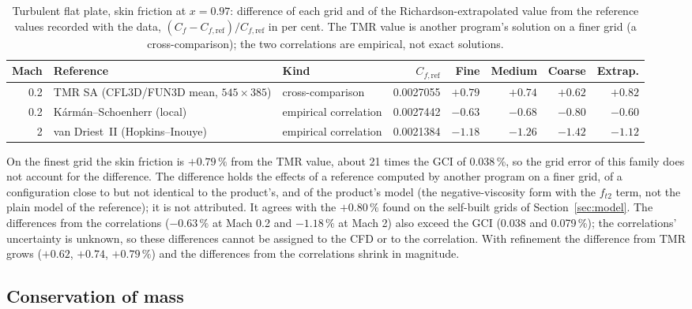 \documentclass[11pt,a4paper]{article}
\begin{document}
\begin{table}[t]
\centering
\caption{Turbulent flat plate, skin friction at $x=0.97$: difference of each grid and of the Richardson-extrapolated value from the reference values recorded with the data,
$(C_f-C_{f,\mathrm{ref}})/C_{f,\mathrm{ref}}$ in per cent. The TMR value is another program's solution on a finer grid (a cross-comparison); the two correlations are empirical, not exact solutions.}
\label{tab:turbref}
\footnotesize
\setlength{\tabcolsep}{4pt}
\begin{tabular}{@{}rp{3.5cm}p{3.1cm}rrrrr@{}}
\toprule
Mach & Reference & Kind & $C_{f,\mathrm{ref}}$ & Fine & Medium & Coarse & Extrap. \\
\midrule
0.2 & TMR SA (CFL3D/FUN3D mean, $545\times385$) & cross-comparison & 0.0027055 & $+0.79$ & $+0.74$ & $+0.62$ & $+0.82$ \\
0.2 & K\'arm\'an--Schoenherr (local) & empirical correlation & 0.0027442 & $-0.63$ & $-0.68$ & $-0.80$ & $-0.60$ \\
2 & van Driest~II (Hopkins--Inouye) & empirical correlation & 0.0021384 & $-1.18$ & $-1.26$ & $-1.42$ & $-1.12$ \\
\bottomrule
\end{tabular}
\end{table}

On the finest grid the skin friction is $+0.79\,\%$ from the TMR value, about 21 times the GCI of 0.038\,\%, so the grid error of this family does not account for the difference.
The difference holds the effects of a reference computed by another program on a finer grid, of a configuration close to but not identical to the product's, and of the product's model
(the negative-viscosity form with the $f_{t2}$ term, not the plain model of the reference); it is not attributed.
It agrees with the $+0.80\,\%$ found on the self-built grids of Section~\ref{sec:model}.
The differences from the correlations ($-0.63\,\%$ at Mach 0.2 and $-1.18\,\%$ at Mach 2) also exceed the GCI (0.038 and 0.079\,\%); the correlations' uncertainty is unknown, so these differences cannot be assigned to the CFD or to the correlation.
With refinement the difference from TMR grows ($+0.62$, $+0.74$, $+0.79\,\%$) and the differences from the correlations shrink in magnitude.

\subsection{Conservation of mass}
\label{sec:massflux}
\end{document}
